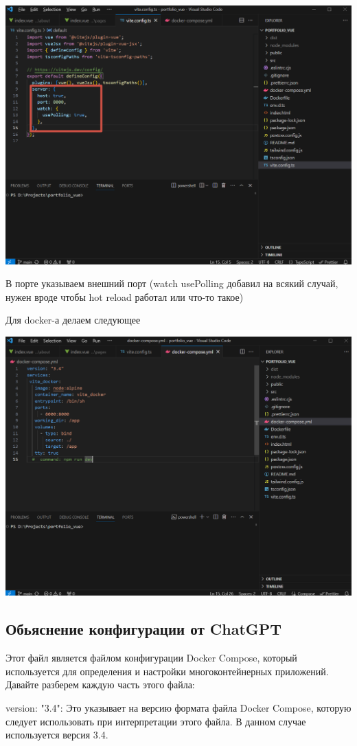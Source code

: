 \documentclass[14pt, a4paper]{extarticle}
\begin{document}
\includegraphics*[width=0.8\linewidth]{img/2024-02-17-20-12-31.png}

В порте указываем внешний порт (watch usePolling добавил на всякий случай, нужен вроде чтобы hot reload работал или что-то такое)

Для docker-а делаем следующее

\includegraphics*[width=0.8\linewidth]{img/2024-02-17-20-14-32.png}

\subsection{Обьяснение конфигурации от ChatGPT}

Этот файл является файлом конфигурации Docker Compose, который используется для определения и настройки многоконтейнерных приложений. Давайте разберем каждую часть этого файла:

version: "3.4": Это указывает на версию формата файла Docker Compose, которую следует использовать при интерпретации этого файла. В данном случае используется версия 3.4.
\end{document}
